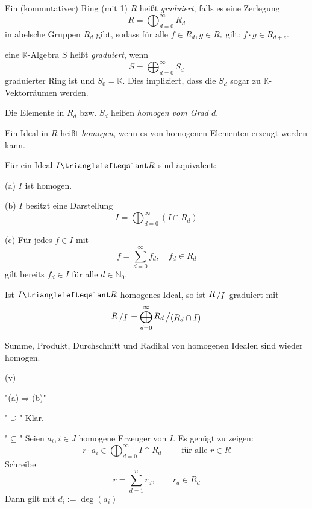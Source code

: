 \documentclass[11pt]{book}
\theoremstyle{nonumberbreak}
\newenvironment{pr}[1][]{\ifthenelse{\equal{#1}{}}{\proof}{\proof[#1]}\rm}{\endproof}
\newenvironment{definbem}[1][]{\ifthenelse{\equal{#1}{}}{\definibem}{\definibem[#1]}\rm}{\enddefinibem}
\newcommand{\slant}[2]{{\raisebox{.1em}{$#1$}\left/\raisebox{-.1em}{$#2$}\right.}}
\begin{document}
\begin{spacing}{1.3}
\begin{definbem} %
\begin{compactenum}
\item Ein (kommutativer) Ring (mit 1) $R$ heißt \textit{graduiert}, falls es eine Zerlegung
$$R= \bigoplus_{d=0}^{\infty} R_d$$
in abelsche Gruppen $R_d$ gibt, sodass für alle $f \in R_d, g \in R_e$ gilt: $f\cdot g \in R_{d+e}$.
\item eine $\mathbb{K}$-Algebra $S$ heißt \textit{graduiert}, wenn
$$S=\bigoplus_{d=0}^{\infty} S_d$$
graduierter Ring ist und $S_0 = \mathbb{K}$. Dies impliziert, dass die $S_d$ sogar zu $\mathbb{K}$-Vektorräumen werden.
\item Die Elemente in $R_d$ bzw. $S_d$ heißen \textit{homogen vom Grad $d$}.
\item Ein Ideal in $R$ heißt \textit{homogen}, wenn es von homogenen Elementen erzeugt werden kann.
\item Für ein Ideal $I \trianglelefteqslant R$ sind äquivalent:
\begin{compactenum}
\item[(a)] $I$ ist homogen.
\item[(b)] $I$ besitzt eine Darstellung$$I= \bigoplus_{d=0}^{\infty} (I \cap R_d)$$
\item[(c)] Für jedes $f \in I$ mit  $$f= \sum_{d=0}^{\infty} f_d, \quad f_d \in R_d$$ gilt bereits $f_d \in I$ für alle $d \in \mathbb{N}_0$.
\end{compactenum}
\item Ist $I \trianglelefteqslant R$ homogenes Ideal, so ist $\slant{R}{I}$ graduiert mit
$$\slant{R}{I} = \bigoplus_{d=0}^{\infty} \slant{R_d}{(R_d \cap I)}$$
\item Summe, Produkt, Durchschnitt und Radikal von homogenen Idealen sind wieder homogen.
\end{compactenum}
\begin{pr}
\begin{compactenum}
\item[(v)] \begin{compactenum}
\item["(a)$\Rightarrow$(b)"] \begin{compactenum}
\item["$\supseteq$"] Klar.
\item["$\subseteq$"] Seien $a_i, i \in J$ homogene Erzeuger von $I$. Es genügt zu zeigen:
$$r \cdot a_i \in \bigoplus_{d=0}^{\infty} I \cap R_d \qquad \textrm{ für alle } r \in R$$
Schreibe
$$r= \sum_{d=1}^n r_d, \qquad r_d \in R_d$$
Dann gilt mit $d_i :=\deg(a_i)$

\end{compactenum}
\end{compactenum}
\end{compactenum}
\end{pr}
\end{definbem}
\end{spacing}
\end{document}
